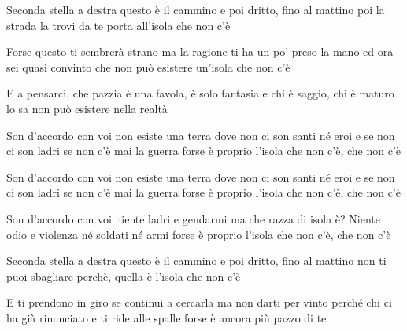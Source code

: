 
\beginverse

Seconda stella a destra
questo è il cammino
e poi dritto, fino al mattino
poi la strada la trovi da te
porta all'isola che non c'è 

\endverse

\beginverse

Forse questo ti sembrerà strano
ma la ragione
ti ha un po' preso la mano
ed ora sei quasi convinto che non può esistere un'isola che non c'è 

\endverse

\beginverse

E a pensarci, che pazzia
è una favola, è solo fantasia
e chi è saggio, chi è maturo lo sa
non può esistere nella realtà

\endverse

\beginchorus

Son d'accordo con voi
non esiste una terra
dove non ci son santi né eroi
e se non ci son ladri
se non c'è mai la guerra
forse è proprio l'isola
che non c'è, che non c'è 

\endchorus

\beginverse

Son d'accordo con voi
non esiste una terra
dove non ci son santi né eroi
e se non ci son ladri
se non c'è mai la guerra
forse è proprio l'isola
che non c'è, che non c'è 

\endverse

\beginchorus

Son d'accordo con voi
niente ladri e gendarmi
ma che razza di isola è?
Niente odio e violenza
né soldati né armi
forse è proprio l'isola
che non c'è, che non c'è 

\endchorus

\beginverse

Seconda stella a destra
questo è il cammino
e poi dritto, fino al mattino
non ti puoi sbagliare perchè,
quella è l'isola che non c'è

\endverse

\beginchorus

E ti prendono in giro
se continui a cercarla
ma non darti per vinto perché
chi ci ha già rinunciato
e ti ride alle spalle
forse è ancora più pazzo di te 

\endchorus 

\endsong

